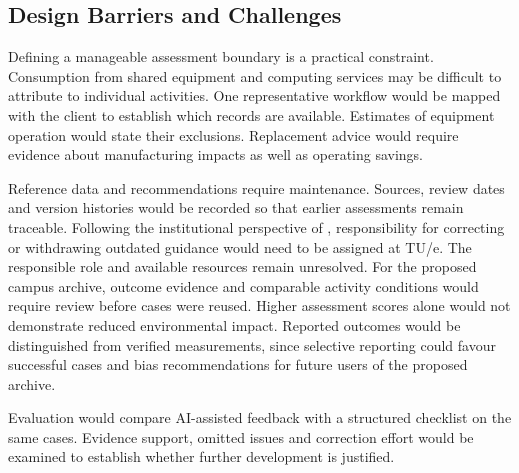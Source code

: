 \documentclass[11pt,a4paper]{article}
\begin{document}
\subsection{Design Barriers and Challenges}

Defining a manageable assessment boundary is a practical constraint. Consumption from shared equipment and computing services may be difficult to attribute to individual activities. One representative workflow would be mapped with the client to establish which records are available. Estimates of equipment operation would state their exclusions. Replacement advice would require evidence about manufacturing impacts as well as operating savings.

Reference data and recommendations require maintenance. Sources, review dates and version histories would be recorded so that earlier assessments remain traceable. Following the institutional perspective of \citet{hasselbalch2025sustainability}, responsibility for correcting or withdrawing outdated guidance would need to be assigned at TU/e. The responsible role and available resources remain unresolved. For the proposed campus archive, outcome evidence and comparable activity conditions would require review before cases were reused. Higher assessment scores alone would not demonstrate reduced environmental impact. Reported outcomes would be distinguished from verified measurements, since selective reporting could favour successful cases and bias recommendations for future users of the proposed archive.

Evaluation would compare AI-assisted feedback with a structured checklist on the same cases. Evidence support, omitted issues and correction effort would be examined to establish whether further development is justified.
\end{document}
